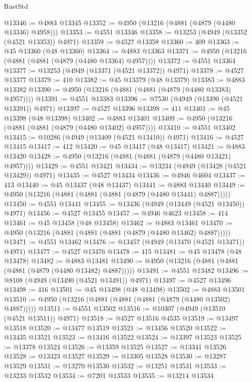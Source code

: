 \begin{lexlean}{RustStd}
\begin{coremodule}
@13346 := @4883 @13345
@13352 := @4950 (@13216 (@4881 (@4879 (@4480 @13346) @4958)))
@13353 := @4551 @13346
@13358 := @13253 (@4949 (@13352 (@4521 @13353)) @4971)
@13359 := @4527 @13358
@13360 := 409
@13363 := @45 @13360 (@48 @13360)
@13364 := @4883 @13363
@13371 := @4950 (@13216 (@4881 (@4881 (@4879 (@4480 @13364) @4957))))
@13372 := @4551 @13364
@13377 := @13253 (@4949 (@13371 (@4521 @13372)) @4971)
@13378 := @4527 @13377
@13379 := 410
@13382 := @45 @13379 (@48 @13379)
@13383 := @4883 @13382
@13390 := @4950 (@13216 (@4881 (@4881 (@4879 (@4480 @13383) @4957))))
@13391 := @4551 @13383
@13396 := @7530 (@4949 (@13390 (@4521 @13391)) @4971)
@13397 := @4527 @13396
@13398 := 411
@13401 := @45 @13398 (@48 @13398)
@13402 := @4883 @13401
@13409 := @4950 (@13216 (@4881 (@4881 (@4879 (@4480 @13402) @4957))))
@13410 := @4551 @13402
@13415 := @10286 (@4949 (@13409 (@4521 @13410)) @4971)
@13416 := @4527 @13415
@13417 := 412
@13420 := @45 @13417 (@48 @13417)
@13421 := @4883 @13420
@13428 := @4950 (@13216 (@4881 (@4881 (@4879 (@4480 @13421) @4957))))
@13429 := @4551 @13421
@13434 := @13234 (@4949 (@13428 (@4521 @13429)) @4971)
@13435 := @4527 @13434
@13436 := @4946 @4604
@13437 := 413
@13440 := @45 @13437 (@48 @13437)
@13441 := @4883 @13440
@13449 := @4950 (@13216 (@4881 (@4881 (@4881 (@4879 (@4480 @13441) @4887)))))
@13450 := @4551 @13441
@13455 := @13436 (@4949 (@13449 (@4521 @13450)) @4971)
@13456 := @4527 @13455
@13457 := @4946 @4623
@13458 := 414
@13461 := @45 @13458 (@48 @13458)
@13462 := @4883 @13461
@13470 := @4950 (@13216 (@4881 (@4881 (@4881 (@4879 (@4480 @13462) @4887)))))
@13471 := @4551 @13462
@13476 := @13457 (@4949 (@13470 (@4521 @13471)) @4971)
@13477 := @4527 @13476
@13478 := 415
@13481 := @45 @13478 (@48 @13478)
@13482 := @4883 @13481
@13490 := @4950 (@13216 (@4881 (@4881 (@4881 (@4879 (@4480 @13482) @4887)))))
@13491 := @4551 @13482
@13496 := @8108 (@4949 (@13490 (@4521 @13491)) @4971)
@13497 := @4527 @13496
@13498 := 416
@13501 := @45 @13498 (@48 @13498)
@13502 := @4883 @13501
@13510 := @4950 (@13216 (@4881 (@4881 (@4881 (@4879 (@4480 @13502) @4887)))))
@13511 := @4551 @13502
@13516 := @10307 (@4949 (@13510 (@4521 @13511)) @4971)
@13518 := @4527 @13516 @4535
@13519 := @13497 @13518
@13520 := @13477 @13519
@13521 := @13456 @13520
@13522 := @13435 @13521
@13523 := @13416 @13522
@13524 := @13397 @13523
@13525 := @13378 @13524
@13526 := @13359 @13525
@13527 := @13341 @13526
@13528 := @13323 @13527
@13529 := @13305 @13528
@13530 := @13287 @13529
@13531 := @13270 @13530
@13532 := @13251 @13531
@13533 := @13233 @13532
@13534 := @7201 @13533
@13535 := @13214 @13534

\end{coremodule}
\end{lexlean}
